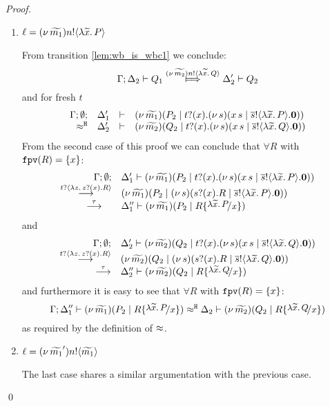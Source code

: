 \begin{proof}
\begin{enumerate}
		\item	$\ell = (\nu\, \widetilde{m_1}) n ! \langle \lambda \widetilde{x}.\,P \rangle$

				\noi From transition \eqref{lem:wb_is_wbc1} we conclude:
			\[
				\horel{\Gamma}{\Delta_2}{Q_1}{\Hby{\news{\widetilde{m_2}} \bactout{n}{\abs{\widetilde{x}}{Q}}}}{\Delta_2'}{Q_2}
			\]
				\noi and for fresh $t$
			\[
				\begin{array}{rcll} \Gamma; \emptyset; &\Delta_1'& \vdash& (\nu\, \widetilde{m_1})(P_2 \;|\; t ? (x) . (\nu\, s)(x\, {s} \;|\; \overline{s} ! \langle \lambda \widetilde{x}.\,P \rangle . \mathbf{0}))\\ \approx^\mathtt{H} &\Delta_2'& \vdash &  (\nu\, \widetilde{m_2})(Q_2 \;|\; t ? (x) . (\nu\, s)(x\, {s} \;|\; \overline{s} ! \langle \lambda \widetilde{x}.\,Q \rangle . \mathbf{0})) \end{array}
			\]
				\noi From the  second case of this proof we can conclude that $\forall R$ with $\mathtt{fpv}(R) = \{x\}$:
			\[
				\begin{array}{rl}
					\Gamma; \es; &\Delta_1' \proves \newsp{\widetilde{m_1}}{P_2 \Par \binp{t}{x} \newsp{s}{\appl{x}{s} \Par \bout{\dual{s}}{\abs{\widetilde{x}}{P}} \inact}} \\
					\by{\bactinp{t}{\abs{z}{\binp{z}{x} R}}}& \newsp{\widetilde{m_1}}{P_2 \Par \newsp{s}{\binp{s}{x} R \Par \bout{\dual{s}}{\abs{\widetilde{x}}{P}} \inact}}\\
					\by{\tau} \quad &\Delta_1'' \proves \newsp{\widetilde{m_1}}{P_2 \Par  R \subst{\abs{\widetilde{x}}{P}}{x}}
				\end{array}
			\]
				\noi and
			\[
				\begin{array}{rl}
					\Gamma; \es; &\Delta_2' \proves \newsp{\widetilde{m_2}}{Q_2 \Par \binp{t}{x} \newsp{s}{\appl{x}{s} \Par \bout{\dual{s}}{\abs{\widetilde{x}}{Q}} \inact}} \\
					\by{\bactinp{t}{\abs{z}{\binp{z}{x} R}}} &\newsp{\widetilde{m_2}}{Q_2 \Par \newsp{s}{\binp{s}{x} R \Par \bout{\dual{s}}{\abs{\widetilde{x}}{Q}} \inact}}\\
					\by{\tau} &\Delta_2'' \proves \newsp{\widetilde{m_2}}{Q_2 \Par  R \subst{\abs{\widetilde{x}}{Q}}{x}}
				\end{array}
			\]
				\noi and furthermore it is easy to see that $\forall R$ with $\mathtt{fpv}(R) = \{x\}$:
			\[
				\horel{\Gamma}{\Delta_1''}{\newsp{\widetilde{m_1}}{P_2 \Par  R \subst{\abs{\widetilde{x}}{P}}{x}}}{\hwb}{\Delta_2}{\newsp{\widetilde{m_2}}{Q_2 \Par R \subst{\abs{\widetilde{x}}{Q}}{x}}}
			\]
				\noi as required by the definition of $\approx$.

		\item	$\ell = (\nu\, \widetilde{m_1}') n ! \langle \widetilde{m_1} \rangle$

				The last case shares a similar argumentation with the previous case.
	\end{enumerate}
	\qed
\end{proof}


